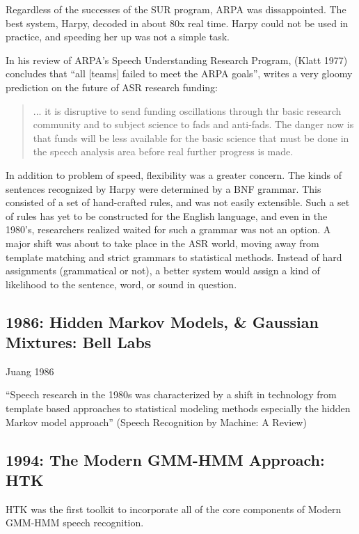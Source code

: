 \documentclass[10pt,a4paper]{article}
\begin{document}
Regardless of the successes of the SUR program, ARPA was dissappointed. The best system, Harpy, decoded in about 80x real time. Harpy could not be used in practice, and speeding her up was not a simple task.

In his review of ARPA's Speech Understanding Research Program, (Klatt 1977) concludes that ``all [teams] failed to meet the ARPA goals'', writes a very gloomy prediction on the future of ASR research funding:

\begin{quote}
  ... it is disruptive to send funding oscillations through thr basic research community and to subject science to fads and anti-fads. The danger now is that funds will be less available for the basic science that must be done in the speech analysis area before real further progress is made.
\end{quote}

In addition to problem of speed, flexibility was a greater concern. The kinds of sentences recognized by Harpy were determined by a BNF grammar. This consisted of a set of hand-crafted rules, and was not easily extensible. Such a set of rules has yet to be constructed for the English language, and even in the 1980's, researchers realized waited for such a grammar was not an option. A major shift was about to take place in the ASR world, moving away from template matching and strict grammars to statistical methods. Instead of hard assignments (grammatical or not), a better system would assign a kind of likelihood to the sentence, word, or sound in question.


\subsection{1986: Hidden Markov Models, \& Gaussian Mixtures: Bell Labs}

Juang 1986

``Speech research in the 1980s was characterized by a shift in technology from template based approaches to statistical modeling methods especially the hidden Markov model approach'' (Speech Recognition by Machine: A Review)


\subsection{1994: The Modern GMM-HMM Approach: HTK}

HTK was the first toolkit to incorporate all of the core components of Modern GMM-HMM speech recognition.
\end{document}
